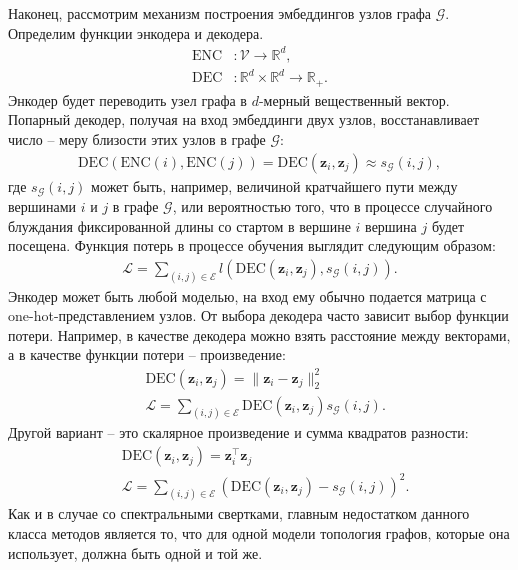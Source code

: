\documentclass[]{article}
\let\v\mathbf
\begin{document}
Наконец, рассмотрим механизм построения эмбеддингов узлов графа $\mathcal{G}$. Определим функции энкодера и декодера. 
\begin{align}
    \text{ENC}&:\mathcal{V}\to\mathbb{R}^d,\\
    \text{DEC}&:\mathbb{R}^d\times\mathbb{R}^d\to\mathbb{R}_+.
\end{align}
Энкодер будет переводить узел графа в $d$-мерный вещественный вектор. Попарный декодер, получая на вход эмбеддинги двух узлов, восстанавливает число -- меру близости этих узлов в графе $\mathcal{G}$:
\begin{align}
    \text{DEC}\left(\text{ENC}(i),\text{ENC}(j)\right)=\text{DEC}\left(\v{z}_i,\v{z}_j\right)\approx s_{\mathcal{G}}(i,j),
\end{align}
где $s_{\mathcal{G}}(i,j)$ может быть, например, величиной кратчайшего пути между вершинами $i$ и $j$ в графе $\mathcal{G}$, или вероятностью того, что в процессе случайного блуждания фиксированной длины со стартом в вершине $i$ вершина $j$ будет посещена.
Функция потерь в процессе обучения выглядит следующим образом:
\begin{align}
    \mathcal{L}=\sum_{(i,j)\in\mathcal{E}}l\left(\text{DEC}\left(\v{z}_i,\v{z}_j\right), s_{\mathcal{G}}(i,j)\right).
\end{align}
Энкодер может быть любой моделью, на вход ему обычно подается матрица с one-hot-представлением узлов. От выбора декодера часто зависит выбор функции потери. Например, в качестве декодера можно взять расстояние между векторами, а в качестве функции потери -- произведение:
\begin{align}
    &\text{DEC}(\v{z}_i, \v{z}_j)=\|\v{z}_i-\v{z}_j\|_2^2\\
    &\mathcal{L}=\sum_{(i,j)\in\mathcal{E}}\text{DEC}(\v{z}_i, \v{z}_j)s_{\mathcal{G}}(i, j).
\end{align}
Другой вариант -- это скалярное произведение и сумма квадратов разности:
\begin{align}
    &\text{DEC}(\v{z}_i, \v{z}_j)=\v{z}_i^{\top}\v{z}_j\\
    &\mathcal{L}=\sum_{(i,j)\in\mathcal{E}}\left(\text{DEC}(\v{z}_i, \v{z}_j)-s_{\mathcal{G}}(i, j)\right)^2.
\end{align}
Как и в случае со спектральными свертками, главным недостатком данного класса методов является то, что для одной модели топология графов, которые она использует, должна быть одной и той же.

\bigskip



\end{document}
